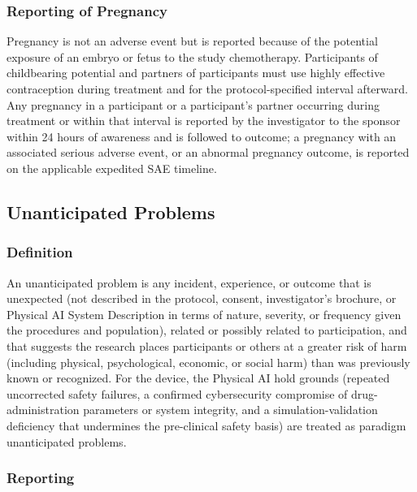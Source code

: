 \subsubsection{Reporting of Pregnancy}

Pregnancy is not an adverse event but is reported because of the potential exposure
of an embryo or fetus to the study chemotherapy. Participants of childbearing
potential and partners of participants must use highly effective contraception during
treatment and for the protocol-specified interval afterward. Any pregnancy in a
participant or a participant's partner occurring during treatment or within that
interval is reported by the investigator to the sponsor within 24 hours of awareness
and is followed to outcome; a pregnancy with an associated serious adverse event, or
an abnormal pregnancy outcome, is reported on the applicable expedited SAE timeline.

\clearpage

\subsection{Unanticipated Problems}

\subsubsection{Definition}

An unanticipated problem is any incident, experience, or outcome that is unexpected
(not described in the protocol, consent, investigator's brochure, or Physical AI
System Description in terms of nature, severity, or frequency given the procedures
and population), related or possibly related to participation, and that suggests the
research places participants or others at a greater risk of harm (including physical,
psychological, economic, or social harm) than was previously known or recognized. For
the device, the Physical AI hold grounds (repeated uncorrected safety failures, a
confirmed cybersecurity compromise of drug-administration parameters or system
integrity, and a simulation-validation deficiency that undermines the pre-clinical
safety basis) are treated as paradigm unanticipated problems.

\subsubsection{Reporting}

